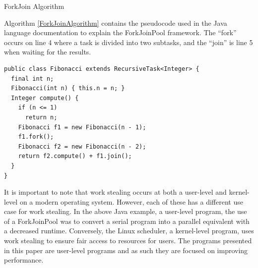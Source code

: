 \documentclass[12pt]{article}
\begin{document}
\IncMargin{1em}
\begin{algorithm}[H]
 \caption{ForkJoin Algorithm}
 \label{ForkJoinAlgorithm}
\end{algorithm}
\DecMargin{1em}
\medskip
Algorithm \ref{ForkJoinAlgorithm} contains the pseudocode used in the Java language documentation to explain the ForkJoinPool framework. The ``fork'' occurs on line 4 where a task is divided into two subtasks, and the ``join'' is line 5 when waiting for the results.

\begin{lstlisting}[caption={An implementation of the Fibonacci algorithm using the ForkJoinFramework taken from the Java documentation},label=JavaRecursive]
public class Fibonacci extends RecursiveTask<Integer> {
  final int n;
  Fibonacci(int n) { this.n = n; }
  Integer compute() {
    if (n <= 1)
      return n;
    Fibonacci f1 = new Fibonacci(n - 1);
    f1.fork();
    Fibonacci f2 = new Fibonacci(n - 2);
    return f2.compute() + f1.join();
  }
}
\end{lstlisting}

It is important to note that work stealing occurs at both a user-level and kernel-level on a modern operating system. However, each of these has a different use case for work stealing. In the above Java example, a user-level program, the use of a ForkJoinPool was to convert a serial program into a parallel equivalent with a decreased runtime. Conversely, the Linux scheduler, a kernel-level program, uses work stealing to ensure fair access to resources for users. The programs presented in this paper are user-level programs and as such they are focused on improving performance.
\end{document}
